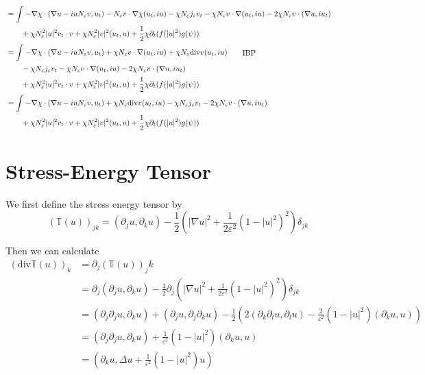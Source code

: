 \documentclass[a4paper]{article}
\renewcommand{\div}{\mathrm{div}}
\begin{document}
\begin{align}
  &= \int_{}^{} - \nabla \chi \cdot ( \nabla u - iuN_\varepsilon v, u_t) - N_\varepsilon v \cdot \nabla \chi (u_t, iu) - \chi N_\varepsilon
  j_\varepsilon v_t - \chi N_\varepsilon v \cdot \nabla (u_t, iu) - 2 \chi
  N_\varepsilon v \cdot (\nabla u, iu_t) \nonumber \\
  &\quad \quad + \chi N_\varepsilon^2 |u|^2 v_t \cdot v + \chi N_\varepsilon^2 |v|^2 (u_t, u) + \frac{1}{2} \chi \partial_t (f(|u|^2) g(\psi)) \nonumber \\
  &= \int_{}^{} - \nabla \chi \cdot (\nabla u - iu N_\varepsilon v, u_t) + \chi N_\varepsilon v \cdot \nabla (u_t, iu) + \chi N_\varepsilon \div v
  (u_t, iu) \quad \quad \parbox{5cm}{IBP} \nonumber \\
  &\quad \quad - \chi N_\varepsilon j_\varepsilon v_t - \chi N_\varepsilon v \cdot \nabla (u_t, iu) - 2 \chi
  N_\varepsilon v \cdot (\nabla u, iu_t) \nonumber \\
  &\quad \quad + \chi N_\varepsilon^2 |u|^2 v_t \cdot v + \chi N_\varepsilon^2 |v|^2 (u_t, u) + \frac{1}{2} \chi \partial_t (f(|u|^2) g(\psi)) \nonumber \\
  &= \int_{}^{} - \nabla \chi \cdot (\nabla u - iu N_\varepsilon v, u_t) + \chi N_\varepsilon \div v (u_t, iu) - \chi N_\varepsilon j_\varepsilon v_t - 2 \chi
  N_\varepsilon v \cdot (\nabla u, iu_t) \nonumber \\
  &\quad \quad + \chi N_\varepsilon^2 |u|^2 v_t \cdot v + \chi N_\varepsilon^2 |v|^2 (u_t, u) + \frac{1}{2} \chi \partial_t (f(|u|^2) g(\psi))
  \label{eqn:mod_energy_deriv}
\end{align}

\section{Stress-Energy Tensor}
We first define the stress energy tensor by
\begin{equation}
  (\mathbb{T}(u))_{jk} = (\partial_j u, \partial_k u) - \frac{1}{2} \left( |\nabla u|^2 + \frac{1}{2 \varepsilon^2} (1 - |u|^2)^2 \right) \delta_{jk}
  \label{eqn:stress_energy}
\end{equation}

Then we can calculate
\begin{align}
  (\div \mathbb{T}(u))_k &= \partial_j (\mathbb{T}(u))_jk \nonumber \\
  &= \partial_j (\partial_j u, \partial_k u) - \frac{1}{2} \partial_j \left( |\nabla u|^2 + \frac{1}{2 \varepsilon^2} ( 1 - |u|^2)^2 \right)
  \delta_{jk} \nonumber \\
  &= (\partial_j \partial_j u, \partial_k u) + (\partial_j u, \partial_j \partial_k u) - \frac{1}{2} \left( 2( \partial_k \partial_l u, \partial_l u)
  - \frac{2}{\varepsilon^2} (1- |u|^2) (\partial_k u, u) \right) \nonumber \\
  &= (\partial_j \partial_j u, \partial_k u) + \frac{1}{\varepsilon^2} (1-|u|^2) (\partial_k u, u) \nonumber \\
  &= ( \partial_k u, \Delta u + \frac{1}{\varepsilon^2} (1 - |u|^2)u)
  \label{eqn:div_stress_energy_comp}
\end{align}
\end{document}
